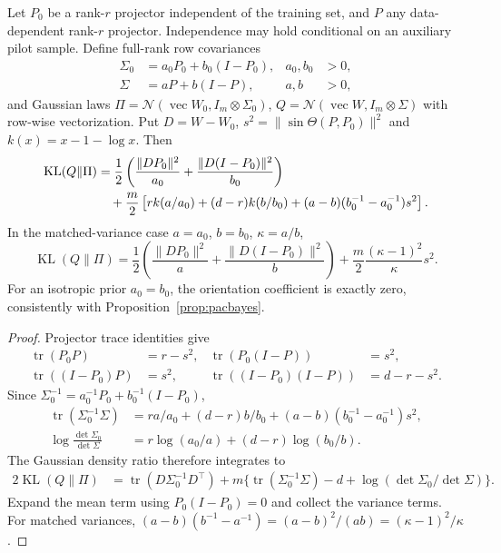 \begin{theorem}
\label{thm:angle-KL}
Let $P_0$ be a rank-$r$ projector independent of the training set, and
$P$ any data-dependent rank-$r$ projector. Independence may hold conditional
on an auxiliary pilot sample. Define full-rank row covariances
\begin{align}
 \Sigma_0&=a_0P_0+b_0(I-P_0),&a_0,b_0&>0,\\
 \Sigma&=aP+b(I-P),&a,b&>0,
\end{align}
and Gaussian laws $\Pi=\mathcal N(\operatorname{vec}W_0,I_m\otimes\Sigma_0)$,
$Q=\mathcal N(\operatorname{vec}W,I_m\otimes\Sigma)$ with row-wise
vectorization. Put $D=W-W_0$, $s^2=\|\sin\Theta(P,P_0)\|^2$ and
$k(x)=x-1-\log x$. Then
\begin{align}
 \operatorname{KL}(Q\|\Pi)
 &=\frac12\left(\frac{\|DP_0\|^2}{a_0}
                    +\frac{\|D(I-P_0)\|^2}{b_0}\right)\notag\\
 &\quad+\frac m2\left[rk(a/a_0)+(d-r)k(b/b_0)
                +(a-b)(b_0^{-1}-a_0^{-1})s^2\right].
 \label{eq:exact-oriented-KL}
\end{align}
In the matched-variance case $a=a_0$, $b=b_0$, $\kappa=a/b$,
\begin{equation}
 \operatorname{KL}(Q\|\Pi)
 =\frac12\left(\frac{\|DP_0\|^2}{a}
                 +\frac{\|D(I-P_0)\|^2}{b}\right)
               +\frac m2\frac{(\kappa-1)^2}{\kappa}s^2.
 \label{eq:matched-oriented-KL}
\end{equation}
For an isotropic prior $a_0=b_0$, the orientation coefficient is exactly
zero, consistently with Proposition~\ref{prop:pacbayes}.
\end{theorem}
\begin{proof}
Projector trace identities give
\begin{align}
 \operatorname{tr}(P_0P)&=r-s^2,&
 \operatorname{tr}(P_0(I-P))&=s^2,\\
 \operatorname{tr}((I-P_0)P)&=s^2,&
 \operatorname{tr}((I-P_0)(I-P))&=d-r-s^2.
\end{align}
Since $\Sigma_0^{-1}=a_0^{-1}P_0+b_0^{-1}(I-P_0)$,
\begin{align}
 \operatorname{tr}(\Sigma_0^{-1}\Sigma)
 &=ra/a_0+(d-r)b/b_0
                   +(a-b)(b_0^{-1}-a_0^{-1})s^2,\\
 \log\frac{\det\Sigma_0}{\det\Sigma}
 &=r\log(a_0/a)+(d-r)\log(b_0/b).
\end{align}
The Gaussian density ratio therefore integrates to
\begin{align}
 2\operatorname{KL}(Q\|\Pi)
 &=\operatorname{tr}(D\Sigma_0^{-1}D^\top)
      +m\{\operatorname{tr}(\Sigma_0^{-1}\Sigma)-d
                                +\log(\det\Sigma_0/\det\Sigma)\}.
\end{align}
Expand the mean term using $P_0(I-P_0)=0$ and collect the variance terms.
For matched variances,
$(a-b)(b^{-1}-a^{-1})=(a-b)^2/(ab)=(\kappa-1)^2/\kappa$.
\end{proof}

